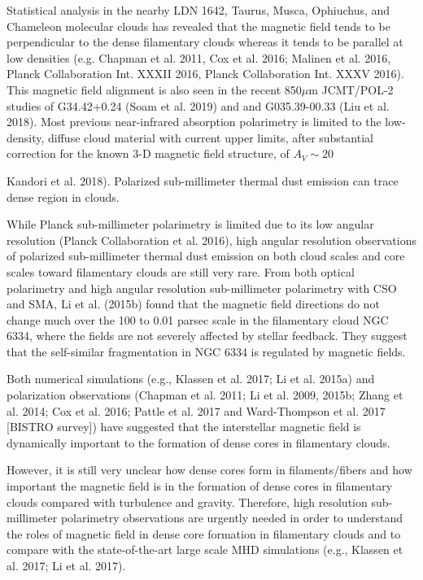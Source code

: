 \documentclass[11pt]{amsart}
\begin{document}
Statistical analysis in the nearby LDN 1642,  Taurus, Musca, Ophiuchus, and Chameleon molecular clouds has revealed 
that the magnetic field tends to be perpendicular to the dense filamentary clouds whereas it tends to be parallel 
at low densities (e.g. Chapman et al. 2011, Cox et al. 2016; Malinen et al. 2016, Planck Collaboration Int. XXXII 2016, Planck Collaboration Int. XXXV 2016). 
This magnetic field alignment is also seen in the recent 850$\mu$m JCMT/POL-2 studies of  G34.42+0.24 (Soam et al. 2019) and 
 and G035.39-00.33 (Liu et al. 2018).
Most previous near-infrared absorption polarimetry is limited to the low-density, diffuse cloud material with current upper limits, after substantial correction for the known 3-D magnetic field structure, of $A_V \sim 20$ {Kandori et al. 2018). Polarized sub-millimeter thermal dust emission can trace dense region in clouds. 

While Planck sub-millimeter polarimetry is limited due to its low angular resolution (Planck Collaboration et al. 2016), high angular resolution observations of polarized sub-millimeter thermal dust emission on both cloud scales and core scales toward filamentary clouds are still very rare. 
From both optical polarimetry and high angular resolution sub-millimeter polarimetry with CSO and SMA, Li et al. (2015b) found that the magnetic field directions do not change much over the 100 to 0.01 parsec scale in the filamentary cloud NGC 6334, where the fields are not severely affected by stellar feedback. 
They suggest that the self-similar fragmentation in NGC 6334 is regulated by magnetic fields.

Both numerical simulations (e.g., Klassen et al. 2017; Li et al. 2015a) and 
polarization observations (Chapman et al. 2011; Li et al. 2009, 2015b; Zhang et al. 2014; Cox et al. 2016; Pattle et al. 2017 and Ward-Thompson et al. 2017 [BISTRO survey]) 
have suggested that the interstellar magnetic field is dynamically important to the formation of dense cores in filamentary clouds. 

However, it is still very unclear how dense cores form in filaments/fibers and how important the magnetic field is in the formation of dense cores in filamentary clouds compared with turbulence and gravity. Therefore, high resolution sub-millimeter polarimetry observations are urgently needed in order to understand the roles of magnetic field in dense core formation in filamentary clouds and to compare with the state-of-the-art large scale MHD simulations (e.g., Klassen et al. 2017; Li et al. 2017).

}
\end{document}
